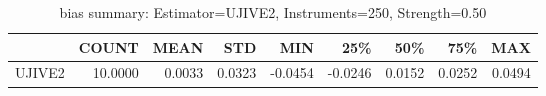 \begin{table}[ht]
\centering
\caption{bias summary: Estimator=UJIVE2, Instruments=250, Strength=0.50}
\begin{tabular}{lrrrrrrrr}
\toprule
 & COUNT & MEAN & STD & MIN & 25\% & 50\% & 75\% & MAX \\
\midrule
UJIVE2 & 10.0000 & 0.0033 & 0.0323 & -0.0454 & -0.0246 & 0.0152 & 0.0252 & 0.0494 \\
\bottomrule
\end{tabular}
\end{table}
